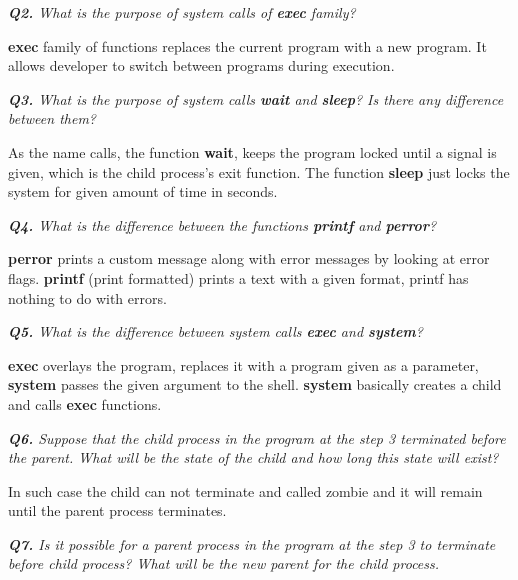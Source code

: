 \documentclass[11pt]{article}
\begin{document}
\vspace{3mm}
\textit{\textbf{Q2.} What is the purpose of system calls of \textbf{exec} family?}
\vspace{3mm}

\textbf{exec} family of functions replaces the current program with a new program. It allows developer to switch between programs during execution.

\vspace{5mm}
\textit{\textbf{Q3.} What is the purpose of system calls \textbf{wait} and \textbf{sleep}? Is there any difference between them?}
\vspace{5mm}

As the name calls, the function \textbf{wait}, keeps the program locked until a signal is given, which is the child process's exit function. The function \textbf{sleep} just locks the system for given amount of time in seconds.

\vspace{5mm}
\textit{\textbf{Q4.} What is the difference between the functions \textbf{printf} and \textbf{perror}?}
\vspace{5mm}

\textbf{perror} prints a custom message along with error messages by looking at error flags. \textbf{printf} (print formatted) prints a text with a given format, printf has nothing to do with errors.

\vspace{5mm}
\textit{\textbf{Q5.} What is the difference between system calls \textbf{exec} and \textbf{system}?}
\vspace{5mm}

\textbf{exec} overlays the program, replaces it with a program given as a parameter, \textbf{system} passes the given argument to the shell. \textbf{system} basically creates a child and calls \textbf{exec} functions.

\vspace{5mm}
\textit{\textbf{Q6.} Suppose that the child process in the program at the step 3 terminated before the parent. What will be the state of the child and how long this state will exist?}
\vspace{5mm}

In such case the child can not terminate and called zombie and it will remain until the parent process terminates.

\vspace{5mm}
\textit{\textbf{Q7.} Is it possible for a parent process in the program at the step 3 to terminate before child process? What will be the new parent for the child process.}
\vspace{5mm}
\end{document}
